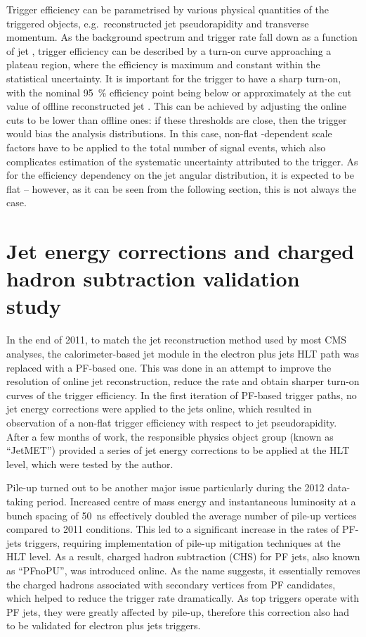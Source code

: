 Trigger efficiency can be parametrised by various physical quantities of the triggered objects, e.g.\ reconstructed jet
pseudorapidity and transverse momentum. As the background spectrum and trigger rate fall down as a function of jet \pt,
trigger efficiency can be described by a turn-on curve approaching a plateau region, where the efficiency is maximum and
constant within the statistical uncertainty. It is important for the trigger to have a sharp turn-on, with the nominal
\SI{95}{\percent} efficiency point being below or approximately at the cut value of offline reconstructed jet \pt. This
can be achieved by adjusting the online cuts to be lower than offline ones: if these thresholds are close, then the
trigger would bias the analysis distributions. In this case, non-flat \pt-dependent scale factors have to be applied to
the total number of signal events, which also complicates estimation of the systematic uncertainty attributed to the
trigger. As for the efficiency dependency on the jet angular distribution, it is expected to be flat -- however, as it
can be seen from the following section, this is not always the case.

\section{Jet energy corrections and charged hadron subtraction validation study}
\label{s:JEC_PFnoPU_validation}
In the end of 2011, to match the jet reconstruction method used by most CMS analyses, the calorimeter-based jet module
in the electron plus jets HLT path was replaced with a PF-based one. This was done in an attempt to improve the \pt
resolution of online jet reconstruction, reduce the rate and obtain sharper turn-on curves of the trigger efficiency. In
the first iteration of PF-based trigger paths, no jet energy corrections were applied to the jets online, which resulted
in observation of a non-flat trigger efficiency with respect to jet pseudorapidity. After a few months of work, the
responsible physics object group (known as ``JetMET'') provided a series of jet energy corrections to be applied at the
HLT level, which were tested by the author.

Pile-up turned out to be another major issue particularly during the 2012 data-taking period. Increased centre of mass
energy and instantaneous luminosity at a bunch spacing of \SI{50}{\ns} effectively doubled the average number of pile-up
vertices compared to 2011 conditions. This led to a significant increase in the rates of PF-jets triggers, requiring
implementation of pile-up mitigation techniques at the HLT level. As a result, charged hadron subtraction (CHS) for PF
jets, also known as ``PFnoPU'', was introduced online. As the name suggests, it essentially removes the charged hadrons
associated with secondary vertices from PF candidates, which helped to reduce the trigger rate dramatically. As top
triggers operate with PF jets, they were greatly affected by pile-up, therefore this correction also had to be validated
for electron plus jets triggers.


